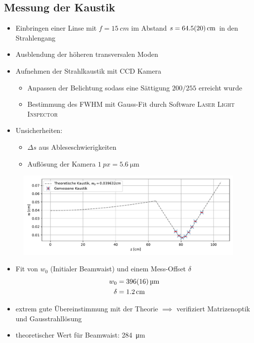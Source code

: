 \documentclass[10pt, aspectratio=169]{beamer}
\begin{document}
\subsection{Messung der Kaustik}
\begin{frame}
  \begin{itemize}
  \item<1-> Einbringen einer Linse mit \(f=\SI{15}{cm}\) im Abstand
    \(s=\SI{64.5\pm 2.0}{\centi\meter}\) in den Strahlengang
  \item<2-> Ausblendung der h\"oheren transversalen Moden
  \item<3-> Aufnehmen der Strahlkaustik mit CCD
    Kamera
    \begin{itemize}
    \item Anpassen der Belichtung sodass eine S\"attigung \(200/255\)
      erreicht wurde
    \item Bestimmung des FWHM mit Gauss-Fit durch Software
      \textsc{Laser Light Inspector} 
    \end{itemize}
  \item<4-> Unsicherheiten:
    \begin{itemize}
    \item \(\Delta s\) aus Ableseschwierigkeiten
    \item Aufl\"osung der Kamera \(\SI{1}{px}=\SI{5.6}{\micro\meter}\)
    \end{itemize}
  \end{itemize}
\end{frame}


\begin{frame}
  \begin{figure}[b]\centering
    \includegraphics[width=.8\columnwidth]{figs/kaustik.pdf}
  \end{figure}
  \begin{itemize}
  \item<1-> Fit von \(w_0\) (Initialer Beamwaist) und einem
    Mess-Offset \(\delta\)
    \begin{align*}
      w_0 & =\SI{396\pm 16}{\micro\meter} \\
      \delta & =\SI{1.2}{cm}
    \end{align*}
  \item<2-> extrem gute \"Ubereinstimmung mit der Theorie \(\implies\)
    verifiziert Matrizenoptik und Gausstrahll\"osung
  \item<3-> theoretischer Wert f\"ur Beamwaist: \SI{284}{\micro\meter}
  \end{itemize}
\end{frame}
\end{document}
